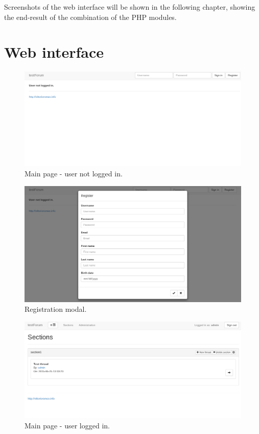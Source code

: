 \documentclass[12pt]{report}
\begin{document}
                Screenshots of the web interface will be shown in the following chapter, showing the end-result of the combination of the PHP modules.

        \chapter{Web interface}
            
            \begin{figure}[!htb]
            \caption{Main page - user not logged in.}
            \centering
            \includegraphics[width=1\textwidth]{u/0}
            \end{figure}

            \begin{figure}[!htb]
            \caption{Registration modal.}
            \centering
            \includegraphics[width=1\textwidth]{u/1}
            \end{figure}

            \begin{figure}[!htb]
            \caption{Main page - user logged in.}
            \centering
            \includegraphics[width=1\textwidth]{u/2}
            \end{figure}
\end{document}
